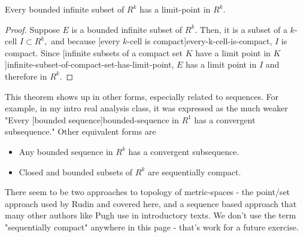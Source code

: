 \documentclass{article}
\begin{document}
\begin{theorem}[Weierstrass]\label{weierstrass}
Every \@{bounded} \@{infinite} subset of $R^k$ has a \@{limit-point} in $R^k.$
\end{theorem}
\begin{proof}
Suppose $E$ is a \@{bounded} infinite subset of $R^k.$ Then, it is a subset of a $k$-cell $I \subset R^k,$ and because \@[every $k$-cell is compact]{every-k-cell-is-compact}, $I$ is compact. Since \@[infinite subsets of a compact set $K$ have a limit point in $K$]{infinite-subset-of-compact-set-has-limit-point}, $E$ has a limit point in $I$ and therefore in $R^k.$
\end{proof}
\begin{note}
This theorem shows up in other forms, especially related to sequences. For example, in my intro real analysis class, it was expressed as the much weaker "Every \@[bounded sequence]{bounded-sequence} in $R^1$ has a \@{convergent} \@{subsequence}." Other equivalent forms are

\begin{itemize}
\item Any bounded sequence in $R^k$ has a convergent subsequence.
\item Closed and bounded subsets of $R^k$ are sequentially compact.
\end{itemize}

There seem to be two approaches to topology of \@{metric-spaces} - the point/set approach used by Rudin and covered here, and a sequence based approach that many other authors like Pugh use in introductory texts. We don't use the term "sequentially compact" anywhere in this page - that's work for a future exercise.
\end{note}
\end{document}
